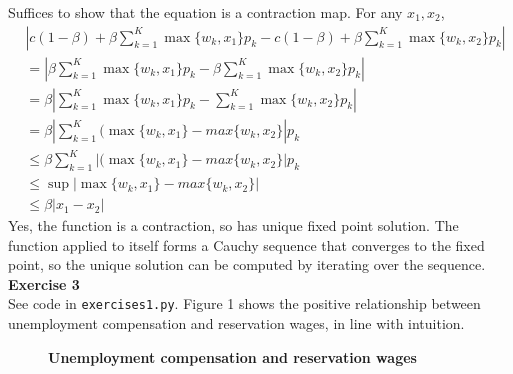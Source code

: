 \documentclass[letterpaper,12pt]{article}
\theoremstyle{definition}
\begin{document}
Suffices to show that the equation is a contraction map. For any $x_1, x_2$,
\begin{equation*}
\begin{split}
&|c(1-\beta) + \beta\sum_{k=1}^{K}\max\{w_k,x_1\}p_k - c(1-\beta) + \beta\sum_{k=1}^{K}\max\{w_k,x_2\}p_k|\\
&=|\beta\sum_{k=1}^{K}\max\{w_k,x_1\}p_k - \beta\sum_{k=1}^{K}\max\{w_k,x_2\}p_k|\\
&=\beta|\sum_{k=1}^{K}\max\{w_k,x_1\}p_k - \sum_{k=1}^{K}\max\{w_k,x_2\}p_k|\\
&=\beta|\sum_{k=1}^{K}(\max\{w_k,x_1\} - max\{w_k, x_2\}|p_k\\
&\leq \beta\sum_{k=1}^{K}|(\max\{w_k,x_1\} - max\{w_k, x_2\}|p_k\\
&\leq \sup|\max\{w_k,x_1\} - max\{w_k, x_2\}|\\
&\leq \beta|x_1 - x_2|
\end{split}
\end{equation*}
Yes, the function is a contraction, so has  unique fixed point solution. The function applied to itself forms a Cauchy sequence that converges to the fixed point, so the unique solution can be computed by iterating over the sequence.\\

\noindent\textbf{Exercise 3}\\
See code in \texttt{exercises1.py}. Figure 1 shows the positive relationship between unemployment compensation and reservation wages, in line with intuition.\\
 
\begin{figure}[htb]\centering\captionsetup{width=4.0in}
  \caption{\textbf{Unemployment compensation and reservation wages}}\label{FigExample}
\end{figure}
\end{document}
